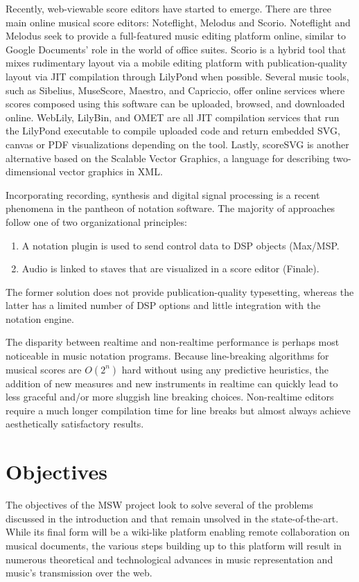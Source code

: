 \documentclass{article}
\begin{document}
Recently, web-viewable score editors have started to emerge. There are three
main online musical score editors: Noteflight, Melodus and Scorio.
Noteflight and Melodus seek to provide a full-featured music editing
platform online, similar to Google Documents’ role in the world of office
suites. Scorio is a hybrid tool that mixes rudimentary layout via a mobile
editing platform with publication-quality layout via JIT compilation through
LilyPond when possible. Several music tools, such as Sibelius, MuseScore,
Maestro, and Capriccio, offer online services where scores composed using
this software can be uploaded, browsed, and downloaded online. WebLily,
LilyBin, and OMET are all JIT compilation services that run the LilyPond
executable to compile uploaded code and return embedded SVG, canvas or PDF
visualizations depending on the tool. Lastly, scoreSVG is another
alternative based on the Scalable Vector Graphics, a language for describing
two-\-di\-men\-sion\-al vector graphics in XML.

Incorporating recording, synthesis and digital signal processing is a recent
phenomena in the pantheon of notation software.  The majority of approaches
follow one of two organizational principles:
\begin{enumerate}
\item A notation plugin is used to send control data to DSP objects (Max/MSP.
\item Audio is linked to staves that are visualized in a score editor
(Finale).
\end{enumerate}
The former solution does not provide publication-quality typesetting,
whereas the latter has a limited number of DSP options and little
integration with the notation engine.

The disparity between realtime and non-realtime performance is perhaps most
noticeable in music notation programs. Because line-breaking algorithms for
musical scores are $O(2^n)$ hard without using any predictive heuristics, the
addition of new measures and new instruments in realtime can quickly lead to
less graceful and/or more sluggish line breaking choices. Non-realtime
editors require a much longer compilation time for line breaks but almost
always achieve aesthetically satisfactory results.



\section{Objectives}\label{sec:objectives}
The objectives of the MSW project look to solve several of the problems
discussed in the introduction and that remain unsolved in the
state-of-the-art. While its final form will be a wiki-like platform enabling
remote collaboration on musical documents, the various steps building up to
this platform will result in numerous theoretical and technological advances
in music representation and music's transmission over the web.
\end{document}
